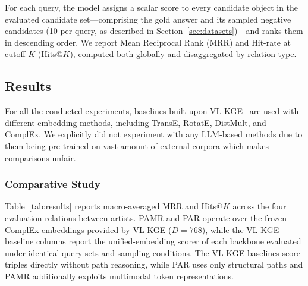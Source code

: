 \documentclass[runningheads]{llncs}
\begin{document}
For each query, the model assigns a scalar score to every candidate
object in the evaluated candidate set---comprising the gold answer and
its sampled negative candidates (10 per query, as described in
Section~\ref{sec:datasets})---and ranks them in descending order. We report Mean Reciprocal
Rank (MRR) and Hit-rate at cutoff $K$ (Hits@$K$), computed both
globally and disaggregated by relation type.

\subsection{Results}
\label{sec:results}

For all the conducted experiments, baselines built upon VL-KGE~\cite{efthymiou2026vlkge} are used with different embedding methods, including TransE, RotatE, DistMult, and ComplEx. We explicitly did not experiment with any LLM-based methods due to them being pre-trained on vast amount of external corpora which makes comparisons unfair.

\subsubsection{Comparative Study}

Table~\ref{tab:results} reports macro-averaged MRR and Hits@$K$ across
the four evaluation relations between artists. PAMR and PAR operate over
the frozen ComplEx embeddings provided by VL-KGE ($D = 768$), while the
VL-KGE baseline columns report the unified-embedding scorer of each backbone
evaluated under identical query sets and sampling conditions. The VL-KGE
baselines score triples directly
without path reasoning, while PAR uses only structural paths and PAMR
additionally exploits multimodal token representations.
\end{document}

